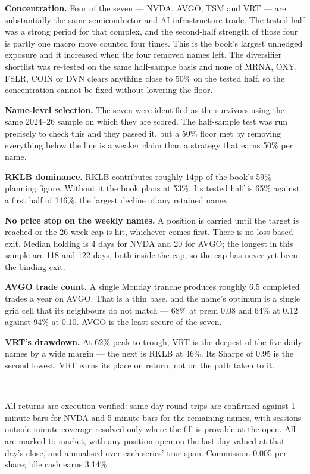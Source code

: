 \documentclass[11pt]{article}
\begin{document}
\textbf{Concentration.} Four of the seven --- NVDA, AVGO, TSM and VRT --- are substantially the
same semiconductor and AI-infrastructure trade. The tested half was a strong period for that
complex, and the second-half strength of those four is partly one macro move counted four times.
This is the book's largest unhedged exposure and it increased when the four removed names left.
The diversifier shortlist was re-tested on the same half-sample basis and none of MRNA, OXY, FSLR,
COIN or DVN clears anything close to 50\% on the tested half, so the concentration cannot be fixed
without lowering the floor.

\textbf{Name-level selection.} The seven were identified as the survivors using the same 2024--26
sample on which they are scored. The half-sample test was run precisely to check this and they
passed it, but a 50\% floor met by removing everything below the line is a weaker claim than a
strategy that earns 50\% per name.

\textbf{RKLB dominance.} RKLB contributes roughly 14pp of the book's 59\% planning figure. Without
it the book plans at 53\%. Its tested half is 65\% against a first half of 146\%, the largest
decline of any retained name.

\textbf{No price stop on the weekly names.} A position is carried until the target is reached or
the 26-week cap is hit, whichever comes first. There is no loss-based exit. Median holding is 4
days for NVDA and 20 for AVGO; the longest in this sample are 118 and 122 days, both inside the
cap, so the cap has never yet been the binding exit.

\textbf{AVGO trade count.} A single Monday tranche produces roughly 6.5 completed trades a year on
AVGO. That is a thin base, and the name's optimum is a single grid cell that its neighbours do not
match --- 68\% at prem 0.08 and 64\% at 0.12 against 94\% at 0.10. AVGO is the least secure of the
seven.

\textbf{VRT's drawdown.} At 62\% peak-to-trough, VRT is the deepest of the five daily names by a
wide margin --- the next is RKLB at 46\%. Its Sharpe of 0.95 is the second lowest. VRT earns its
place on return, not on the path taken to it.

\vfill
{\color{bcrule}\rule{\textwidth}{0.6pt}}\\[0.2em]
{\footnotesize\color{bcgrey} All returns are execution-verified: same-day round trips are
confirmed against 1-minute bars for NVDA and 5-minute bars for the remaining names, with sessions
outside minute coverage resolved only where the fill is provable at the open. All are marked to
market, with any position open on the last day valued at that day's close, and annualised over
each series' true span. Commission 0.005 per share; idle cash earns 3.14\%.}
\end{document}
